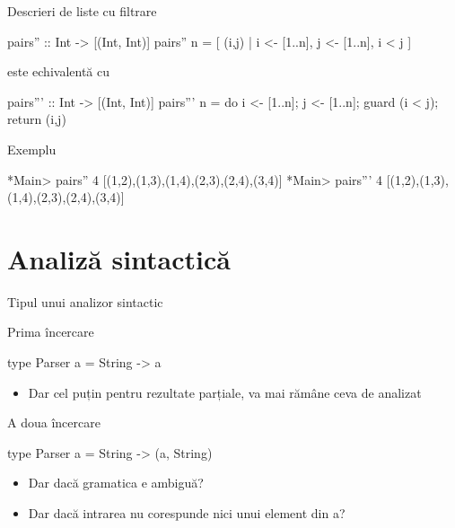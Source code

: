 \documentclass[xcolor=pdftex,romanian,colorlinks]{beamer}
\begin{document}

\begin{frame}[fragile]{Descrieri de liste cu filtrare}
\begin{asciihs}
   pairs'' :: Int -> [(Int, Int)]
   pairs'' n = [ (i,j) | i <- [1..n], j <- [1..n], i < j ]
\end{asciihs}
este echivalentă cu
\begin{asciihs}
   pairs''' :: Int -> [(Int, Int)]
   pairs''' n = do {
                    i <- [1..n];
                    j <- [1..n];
                    guard (i < j);
                    return (i,j)
                  }
\end{asciihs}
Exemplu
\begin{asciihs}
   *Main> pairs'' 4
   [(1,2),(1,3),(1,4),(2,3),(2,4),(3,4)]
   *Main> pairs''' 4
   [(1,2),(1,3),(1,4),(2,3),(2,4),(3,4)]
\end{asciihs}
\end{frame}

\section{Analiză sintactică}

\begin{frame}[fragile]{Tipul unui analizor sintactic}
\begin{block}
{Prima încercare}
\begin{asciihs}
   type Parser a = String -> a
\end{asciihs}
\begin{itemize}
\item Dar cel puțin pentru rezultate parțiale, va mai rămâne ceva de analizat
\end{itemize}
\end{block}
%
\begin{block}
{A doua încercare}
\begin{asciihs}
   type Parser a = String -> (a, String)
\end{asciihs}
\begin{itemize}
\item Dar dacă gramatica e ambiguă?
\item Dar dacă intrarea nu corespunde nici unui element din a?
\end{itemize}
\end{block}
\end{frame}
\end{document}
